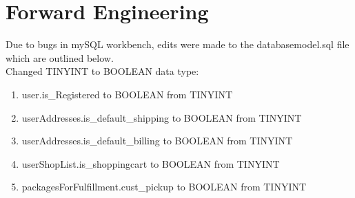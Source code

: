 \pagebreak
\section{Forward Engineering}

Due to bugs in mySQL workbench, edits were made to the databasemodel.sql file which are outlined below.\vspace{5mm}\\
Changed TINYINT to BOOLEAN data type:
\begin{enumerate}
\item user.is\_Registered to BOOLEAN from TINYINT
\item userAddresses.is\_default\_shipping to BOOLEAN from TINYINT
\item userAddresses.is\_default\_billing to BOOLEAN from TINYINT
\item userShopList.is\_shoppingcart to BOOLEAN from TINYINT
\item packagesForFulfillment.cust\_pickup to BOOLEAN from TINYINT
\end{enumerate}